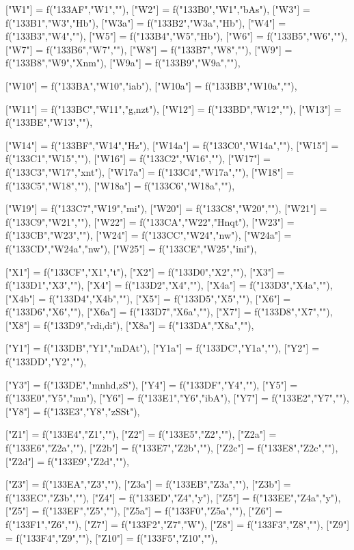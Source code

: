 \documentclass{article}
\begin{document}
\begin{luacode*}
{	["W1"] 	= f("133AF","W1",""),
	["W2"] 	= f("133B0","W1","bAs"),
	["W3"] 	= f("133B1","W3","Hb"),
	["W3a"] 	= f("133B2","W3a","Hb"),
	["W4"] 	= f("133B3","W4",""),
	["W5"] 	= f("133B4","W5","Hb"),
	["W6"] 	= f("133B5","W6",""),
	["W7"] 	= f("133B6","W7",""),
	["W8"] 	= f("133B7","W8",""),
	["W9"] 	= f("133B8","W9","Xnm"),
	["W9a"] 	= f("133B9","W9a",""),

	["W10"] 	= f("133BA","W10","iab"),
	["W10a"] 	= f("133BB","W10a",""),

	["W11"] 	= f("133BC","W11","g,nzt"),
	["W12"] 	= f("133BD","W12",""),
	["W13"] 	= f("133BE","W13",""),

	["W14"] 	= f("133BF","W14","Hz"),
	["W14a"] 	= f("133C0","W14a",""),
	["W15"] 	= f("133C1","W15",""),
	["W16"] 	= f("133C2","W16",""),
	["W17"] 	= f("133C3","W17","xnt"),
	["W17a"] 	= f("133C4","W17a",""),
	["W18"] 	= f("133C5","W18",""),
	["W18a"] 	= f("133C6","W18a",""),

	["W19"] 	= f("133C7","W19","mi"),
	["W20"] 	= f("133C8","W20",""),
	["W21"] 	= f("133C9","W21",""),
	["W22"] 	= f("133CA","W22","Hnqt"),
	["W23"] 	= f("133CB","W23",""),
	["W24"] 	= f("133CC","W24","nw"),
	["W24a"] 	= f("133CD","W24a","nw"),
	["W25"] 	= f("133CE","W25","ini"),


	["X1"] = f("133CF","X1","t"),
 	["X2"] = f("133D0","X2",""),
 	["X3"] = f("133D1","X3",""),
 	["X4"] = f("133D2","X4",""),
 	["X4a"] = f("133D3","X4a",""),
 	["X4b"] = f("133D4","X4b",""),
 	["X5"] = f("133D5","X5",""),
 	["X6"] = f("133D6","X6",""),
 	["X6a"] = f("133D7","X6a",""),
 	["X7"] = f("133D8","X7",""),
	["X8"] = f("133D9","rdi,di"),
 	["X8a"] = f("133DA","X8a",""),


	["Y1"] = f("133DB","Y1","mDAt"),
	["Y1a"] = f("133DC","Y1a",""),
 	["Y2"] = f("133DD","Y2",""),

	["Y3"] = f("133DE","mnhd,zS"),
 	["Y4"] = f("133DF","Y4",""),
	["Y5"] = f("133E0","Y5","mn"),
	["Y6"] = f("133E1","Y6","ibA"),
 	["Y7"] = f("133E2","Y7",""),
	["Y8"] = f("133E3","Y8","zSSt"),

 	["Z1"] = f("133E4","Z1",""),
 	["Z2"] = f("133E5","Z2",""),
 	["Z2a"] = f("133E6","Z2a",""),
 	["Z2b"] = f("133E7","Z2b",""),
	["Z2c"] = f("133E8","Z2c",""),
	["Z2d"] = f("133E9","Z2d",""),


 	["Z3"] = f("133EA","Z3",""),
 	["Z3a"] = f("133EB","Z3a",""),
	["Z3b"] = f("133EC","Z3b",""),
	["Z4"] = f("133ED","Z4","y"),
	["Z5"] = f("133EE","Z4a","y"),
 	["Z5"] = f("133EF","Z5",""),
 	["Z5a"] = f("133F0","Z5a",""),
 	["Z6"] = f("133F1","Z6",""),
	["Z7"] = f("133F2","Z7","W"),
 	["Z8"] = f("133F3","Z8",""),
 	["Z9"] = f("133F4","Z9",""),
 	["Z10"] = f("133F5","Z10",""),


}
\end{luacode*}
\end{document}
